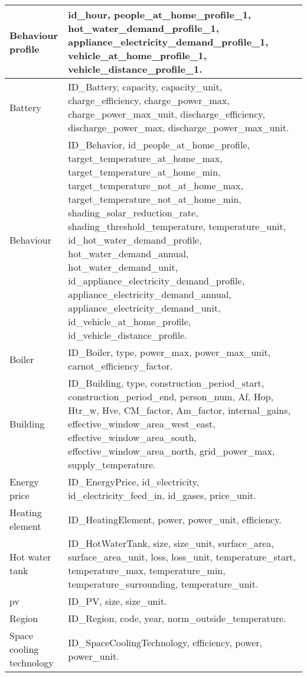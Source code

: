 \begin{center}
\begin{longtable}{ | p{} | p{} | }
        \endlastfoot
            Behaviour profile & id\_hour, people\_at\_home\_profile\_1, hot\_water\_demand\_profile\_1, appliance\_electricity\_demand\_profile\_1, vehicle\_at\_home\_profile\_1, vehicle\_distance\_profile\_1. \\
            \hline 
            Battery & ID\_Battery, capacity, capacity\_unit, charge\_efficiency, charge\_power\_max, charge\_power\_max\_unit, discharge\_efficiency, discharge\_power\_max, discharge\_power\_max\_unit. \\
            \hline 
            Behaviour & ID\_Behavior, id\_people\_at\_home\_profile, target\_temperature\_at\_home\_max, target\_temperature\_at\_home\_min, target\_temperature\_not\_at\_home\_max, target\_temperature\_not\_at\_home\_min, shading\_solar\_reduction\_rate, shading\_threshold\_temperature, temperature\_unit, id\_hot\_water\_demand\_profile, hot\_water\_demand\_annual, hot\_water\_demand\_unit, id\_appliance\_electricity\_demand\_profile, appliance\_electricity\_demand\_annual, appliance\_electricity\_demand\_unit, id\_vehicle\_at\_home\_profile, id\_vehicle\_distance\_profile. \\
            \hline 
            Boiler & ID\_Boiler, type, power\_max, power\_max\_unit, carnot\_efficiency\_factor. \\
            \hline 
            Building & ID\_Building, type, construction\_period\_start, construction\_period\_end, person\_num, Af, Hop, Htr\_w, Hve, CM\_factor, Am\_factor, internal\_gains, effective\_window\_area\_west\_east, effective\_window\_area\_south, effective\_window\_area\_north, grid\_power\_max, supply\_temperature. \\
            \hline
            Energy price & ID\_EnergyPrice, id\_electricity, id\_electricity\_feed\_in, id\_gases, price\_unit. \\
            \hline
            Heating element & ID\_HeatingElement, power, power\_unit, efficiency. \\
            \hline 
            Hot water tank & ID\_HotWaterTank, size, size\_unit, surface\_area, surface\_area\_unit, loss, loss\_unit, temperature\_start, temperature\_max, temperature\_min, temperature\_surrounding, temperature\_unit. \\
            \hline 
            \gls{pv} & ID\_PV, size, size\_unit. \\
            \hline
            Region & ID\_Region, code, year, norm\_outside\_temperature. \\
            \hline 
            Space cooling technology & ID\_SpaceCoolingTechnology, efficiency, power, power\_unit. \\

\end{longtable}
\end{center}
